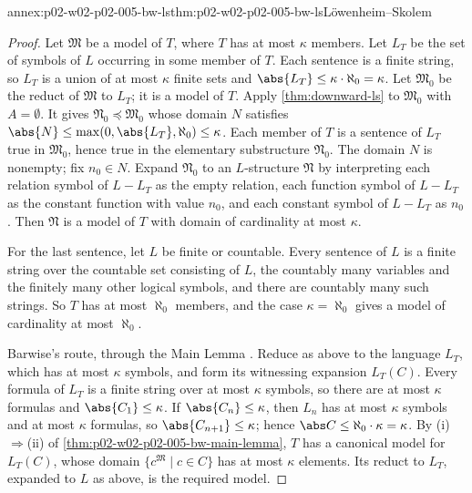 \begin{annexitem}{annex:p02-w02-p02-005-bw-ls}{thm:p02-w02-p02-005-bw-ls}{L\"owenheim--Skolem}
\begin{proof}
Let \(\mathfrak M\) be a model of \(T\), where \(T\) has at most
\(\kappa\) members.  Let \(L_T\) be the set of symbols of \(L\) occurring
in some member of \(T\).  Each sentence is a finite string, so \(L_T\) is
a union of at most \(\kappa\) finite sets and \(\abs{L_T}\leq\kappa\cdot
\aleph_0=\kappa\).  Let \(\mathfrak M_0\) be the reduct of \(\mathfrak M\)
to \(L_T\); it is a model of \(T\).  Apply \cref{thm:downward-ls} to
\(\mathfrak M_0\) with \(A=\emptyset\).  It gives
\(\mathfrak N_0\preccurlyeq\mathfrak M_0\) whose domain \(N\) satisfies
\(\abs{N}\leq\max(0,\abs{L_T},\aleph_0)\leq\kappa\).  Each member of \(T\)
is a sentence of \(L_T\) true in \(\mathfrak M_0\), hence true in the
elementary substructure \(\mathfrak N_0\).  The domain \(N\) is nonempty;
fix \(n_0\in N\).  Expand \(\mathfrak N_0\) to an \(L\)-structure
\(\mathfrak N\) by interpreting each relation symbol of \(L-L_T\) as the
empty relation, each function symbol of \(L-L_T\) as the constant function
with value \(n_0\), and each constant symbol of \(L-L_T\) as \(n_0\).  Then
\(\mathfrak N\) is a model of \(T\) with domain of cardinality at most
\(\kappa\).

For the last sentence, let \(L\) be finite or countable.  Every sentence of
\(L\) is a finite string over the countable set consisting of \(L\), the
countably many variables and the finitely many other logical symbols, and
there are countably many such strings.  So \(T\) has at most \(\aleph_0\)
members, and the case \(\kappa=\aleph_0\) gives a model of cardinality at
most \(\aleph_0\).

Barwise's route, through the Main Lemma
\cite[ch.~A.1, \S4, p.~33]{Barwise1977FirstOrder}.  Reduce as above to the
language \(L_T\), which has at most \(\kappa\) symbols, and form its
witnessing expansion \(L_T(C)\).  Every formula of \(L_T\) is a finite
string over at most \(\kappa\) symbols, so there are at most \(\kappa\)
formulas and \(\abs{C_1}\leq\kappa\).  If \(\abs{C_n}\leq\kappa\), then
\(L_n\) has at most \(\kappa\) symbols and at most \(\kappa\) formulas, so
\(\abs{C_{n+1}}\leq\kappa\); hence \(\abs C\leq\aleph_0\cdot\kappa=\kappa\).
By (i)\(\Rightarrow\)(ii) of \cref{thm:p02-w02-p02-005-bw-main-lemma},
\(T\) has a canonical model for \(L_T(C)\), whose domain
\(\{c^{\mathfrak M}\mid c\in C\}\) has at most \(\kappa\) elements.  Its
reduct to \(L_T\), expanded to \(L\) as above, is the required model.
\end{proof}
\end{annexitem}

